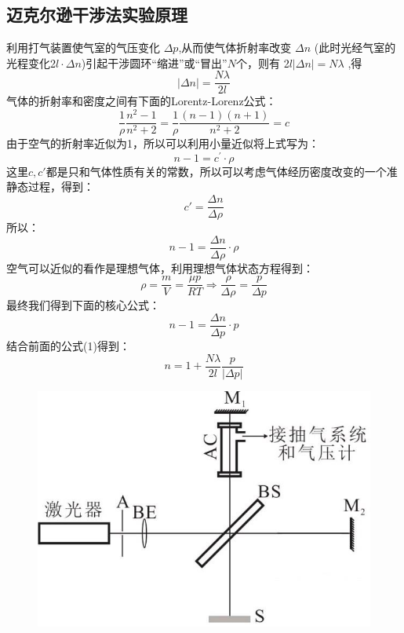 \documentclass{WHUReport}
\begin{document}
\begin{multicols}{2}
	\section{迈克尔逊干涉法实验原理}
	利用打气装置使气室的气压变化 $\Delta p$,从而使气体折射率改变 $\Delta n$ (此时光经气室的光程变化2$l\cdot\Delta n$)引起干涉圆环“缩进”或“冒出”$N$个，则有 2$l|\Delta n|=N\lambda$ ,得
	\begin{equation}
		|\Delta n|=\frac{N\lambda}{2l}
	\end{equation}
	气体的折射率和密度之间有下面的Lorentz-Lorenz公式：
	\begin{equation}
		\frac1\rho\frac{n^2-1}{n^2+2}=\frac1\rho\frac{(n-1)(n+1)}{n^2+2}=c
	\end{equation}
	由于空气的折射率近似为1，所以可以利用小量近似将上式写为：
	\begin{equation}
		n-1=c^{\prime}\cdot\rho 
	\end{equation}
	这里$c,c'$都是只和气体性质有关的常数，所以可以考虑气体经历密度改变的一个准静态过程，得到：
	\begin{equation}
		c'=\frac{\Delta n}{\Delta \rho}
	\end{equation}
	所以：
	\begin{equation}
		n-1=\frac{\Delta n}{\Delta\rho}\cdotp\rho 
	\end{equation}
	空气可以近似的看作是理想气体，利用理想气体状态方程得到：
	\begin{equation}
		\rho=\frac mV=\frac{\mu p}{RT}\Rightarrow\frac\rho{\Delta\rho}=\frac p{\Delta p}
	\end{equation}
	最终我们得到下面的核心公式：
	\begin{equation}
		\boxed{
		n-1=\frac{\Delta n}{\Delta p}\cdotp p}
	\end{equation}
	结合前面的公式(1)得到：
	\begin{equation}
		n=1+\frac{N\lambda}{2l}\frac p{|\Delta p|}
	\end{equation}
	\begin{figure}[H]
		\centering
		\includegraphics[width=\linewidth]{./figs/1.jpg}

\end{figure}
\end{multicols}
\end{document}
